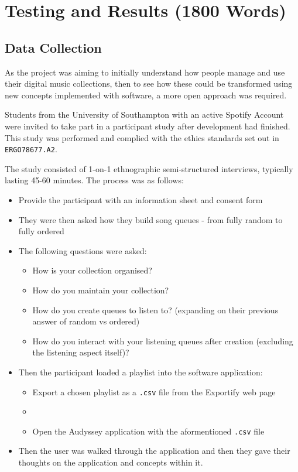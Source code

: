 \chapter{Testing and Results (1800 Words)}
\section{Data Collection}
As the project was aiming to initially understand how people manage and use their digital music collections, then to see how these could be transformed using new concepts implemented with software, a more open approach was required.

Students from the University of Southampton with an active Spotify Account were invited to take part in a participant study after development had finished. This study was performed and complied with the ethics standards set out in \lstinline|ERGO78677.A2|.

The study consisted of 1-on-1 ethnographic semi-structured interviews, typically lasting 45-60 minutes. The process was as follows:\begin{itemize}
    \item Provide the participant with an information sheet and consent form
    \item They were then asked how they build song queues - from fully random to fully ordered
    \item The following questions were asked:\begin{itemize}
        \item How is your collection organised?
        \item How do you maintain your collection?
        \item How do you create queues to listen to? (expanding on their previous answer of random vs ordered)
        \item How do you interact with your listening queues after creation (excluding the listening aspect itself)?
    \end{itemize}
    \item Then the participant loaded a playlist into the software application:\begin{itemize}
        \item Export a chosen playlist as a \lstinline|.csv| file from the Exportify web page
        \item \item Open the Audyssey application with the aformentioned \lstinline|.csv| file
    \end{itemize}
    \item Then the user was walked through the application and then they gave their thoughts on the application and concepts within it.
\end{itemize}

